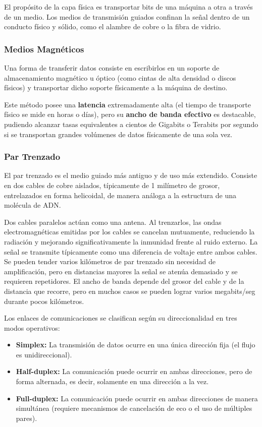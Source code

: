 El propósito de la capa física es transportar bits de una máquina a otra a través de un medio. Los medios de transmisión guiados confinan la señal dentro de un conducto físico y sólido, como el alambre de cobre o la fibra de vidrio.

\subsubsection{Medios Magnéticos}

Una forma de transferir datos consiste en escribirlos en un soporte de almacenamiento magnético u óptico (como cintas de alta densidad o discos físicos) y transportar dicho soporte físicamente a la máquina de destino. 

Este método posee una \textbf{latencia} extremadamente alta (el tiempo de transporte físico se mide en horas o días), pero su \textbf{ancho de banda efectivo} es destacable, pudiendo alcanzar tasas equivalentes a cientos de Gigabits o Terabits por segundo si se transportan grandes volúmenes de datos físicamente de una sola vez.

\subsubsection{Par Trenzado}

El par trenzado es el medio guiado más antiguo y de uso más extendido. Consiste en dos cables de cobre aislados, típicamente de 1 milímetro de grosor, entrelazados en forma helicoidal, de manera análoga a la estructura de una molécula de ADN. 

Dos cables paralelos actúan como una antena. Al trenzarlos, las ondas electromagnéticas emitidas por los cables se cancelan mutuamente, reduciendo la radiación y mejorando significativamente la inmunidad frente al ruido externo. La señal se transmite típicamente como una diferencia de voltaje entre ambos cables. Se pueden tender varios kilómetros de par trenzado sin necesidad de amplificación, pero en distancias mayores la señal se atenúa demasiado y se requieren repetidores. El ancho de banda depende del grosor del cable y de la distancia que recorre, pero en muchos casos se pueden lograr varios megabits/seg durante pocos kilómetros.

Los enlaces de comunicaciones se clasifican según su direccionalidad en tres modos operativos:
\begin{itemize}
    \item \textbf{Simplex:} La transmisión de datos ocurre en una única dirección fija (el flujo es unidireccional).
    \item \textbf{Half-duplex:} La comunicación puede ocurrir en ambas direcciones, pero de forma alternada, es decir, solamente en una dirección a la vez.
    \item \textbf{Full-duplex:} La comunicación puede ocurrir en ambas direcciones de manera simultánea (requiere mecanismos de cancelación de eco o el uso de múltiples pares).
\end{itemize}

